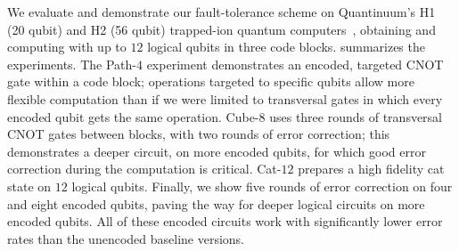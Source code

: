 \documentclass[10pt, twocolumn, aps, nofootinbib, longbibliography, nobibnotes, superscriptaddress]{revtex4-1} %
\begin{document}
We evaluate and demonstrate our fault-tolerance scheme on Quantinuum's H1 (20 qubit) and H2 (56 qubit) trapped-ion quantum computers~\cite{Moses23quantinuum}, obtaining and computing with up to $12$ logical qubits
in three code blocks.  
 summarizes the experiments.  
The Path-$4$ experiment demonstrates an encoded, targeted CNOT gate within a code block; operations targeted to specific qubits allow more flexible computation than if we were limited to transversal gates in which every encoded qubit gets the same operation.  
Cube-$8$ uses three rounds of transversal CNOT gates between blocks, with two rounds of error correction; this demonstrates a deeper circuit, on more encoded qubits, for which good error correction 
during the computation 
is critical.  
Cat-$12$ prepares a high fidelity cat state on $12$ logical qubits.  
Finally, we show five rounds of error correction on four and eight encoded qubits, paving the way for deeper logical circuits on more encoded qubits.  All of these encoded circuits work with significantly lower error rates than the unencoded baseline versions.  
\end{document}
